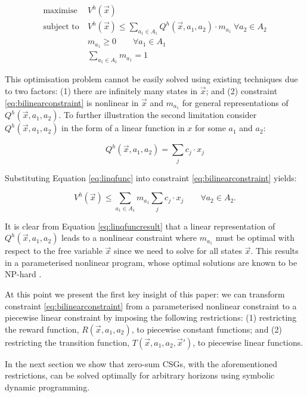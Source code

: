 {\small 
\begin{subequations}
\begin{align}
\text{maximise} &\   V^{h}(\vec{x}) \nonumber \\
\text{subject to} &\   V^{h}(\vec{x}) \leq \sum_{a_1 \in A_1} Q^{h}(\vec{x}, a_1, a_2) \cdot m_{a_{1}} \   \forall a_2 \in A_2 \label{eq:bilinearconstraint} \\
                          &\   m_{a_{1}} \geq 0 \qquad \forall a_{1} \in A_1 \nonumber\\
                          &\   \sum_{a_{1} \in A_1} m_{a_{1}} = 1 \nonumber        
\end{align}
\end{subequations}
}%

This optimisation problem cannot be easily solved using existing techniques
due to two factors: (1) there are infinitely many states in $\vec{x}$; and
(2) constraint \eqref{eq:bilinearconstraint} is nonlinear in $\vec{x}$ and 
$m_{a_{1}}$ for general representations of {\small $Q^{h}(\vec{x}, a_1, a_2)$}. 
To further illustration the second limitation consider 
$Q^{h}(\vec{x}, a_1, a_2)$ in the form of a linear function in $x$ for some
$a_1$ and $a_2$:

{\small 
\begin{equation}
Q^{h}(\vec{x}, a_1, a_2) = \sum_{j} c_j \cdot x_j \label{eq:linqfunc}
\end{equation}
}%

Substituting Equation \eqref{eq:linqfunc} into constraint \eqref{eq:bilinearconstraint}
yields:

{\small 
\begin{equation}
V^{h}(\vec{x}) \leq \sum_{a_1 \in A_1} m_{a_{1}} \sum_{j} c_j \cdot x_j \qquad \forall a_2 \in A_2. \label{eq:linqfuncresult}
\end{equation}
}%

It is clear from Equation \eqref{eq:linqfuncresult} that a linear representation
of $Q^{h}(\vec{x}, a_1, a_2)$ leads to a nonlinear constraint
where $m_{a_{1}}$ must be optimal with respect to the free variable
$\vec{x}$ since we need to solve for all states $\vec{x}$. This results in 
a parameterised nonlinear program, whose optimal solutions are known to be
NP-hard \cite{Bennett_COA_1993,Petrik_JoMLR_2011}.

At this point we present the first key insight of this paper: we
can transform constraint \eqref{eq:bilinearconstraint} from a parameterised 
nonlinear constraint to a piecewise linear constraint by imposing the 
following restrictions: (1) restricting the reward function, {\small $R(\vec{x}, a_1, a_2)$}, 
to piecewise constant functions; and (2) restricting the transition function, 
{\small $T(\vec{x}, a_1, a_2, \vec{x}')$}, to piecewise linear functions.

In the next section we show that zero-sum CSGs, with the aforementioned
restrictions, can be solved optimally for arbitrary horizons using 
symbolic dynamic programming.